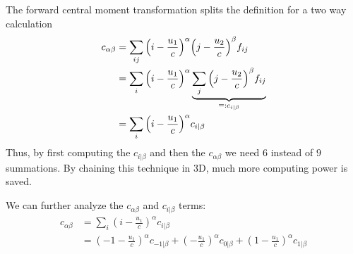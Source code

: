 \documentclass{article}
\begin{document}
The forward central moment transformation splits the definition for a two way calculation
\begin{equation}
  \begin{aligned}
    c_{\alpha\beta}
    & = \sum_{ij} {\left(i-\frac{u_1}{c}\right)}^\alpha {\left(j-\frac{u_2}{c}\right)}^\beta f_{ij} \\
    & = \sum_{i} {\left(i-\frac{u_1}{c}\right)}^\alpha \underbrace{\sum_{j} {\left(j-\frac{u_2}{c}\right)}^\beta f_{ij}}_{\mathrel{\mathop=}: c_{i|\beta}} \\
    & = \sum_{i} {\left(i-\frac{u_1}{c}\right)}^\alpha c_{i|\beta}
  \end{aligned}
\end{equation}
Thus, by first computing the $c_{i|\beta}$ and then the $c_{\alpha\beta}$ we need $6$ instead of $9$ summations. By chaining this technique in 3D, much more computing power is saved.

We can further analyze the $c_{\alpha\beta}$ and $c_{i|\beta}$ terms:
\begin{equation}
  \begin{aligned}
    \label{eq:fast forward c_alpha beta expanded}
    c_{\alpha\beta} & = \sum_{i} {\left(i-\frac{u_1}{c}\right)}^\alpha c_{i|\beta} \\
    & = {\left(-1-\frac{u_1}{c}\right)}^\alpha c_{-1|\beta} + {\left(-\frac{u_1}{c}\right)}^\alpha c_{0|\beta} + {\left(1-\frac{u_1}{c}\right)}^\alpha c_{1|\beta}
  \end{aligned}
\end{equation}
\end{document}
